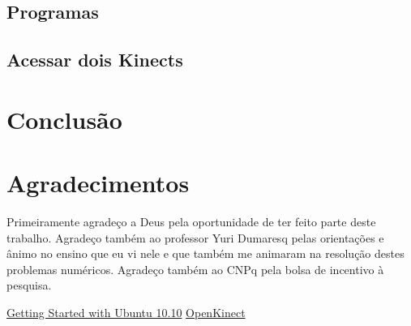 \documentclass[journal]{IEEEtran}
\begin{document}
\subsection{Programas\label{exemplos}}
\newpage

\subsection{Acessar dois Kinects}


\section{Conclusão}

\section*{Agradecimentos}

Primeiramente agradeço a Deus pela oportunidade de ter feito parte deste trabalho. Agradeço também ao professor Yuri Dumaresq pelas orientações e ânimo no ensino que eu vi nele e que também me animaram na resolução destes problemas numéricos. Agradeço também ao CNPq pela bolsa de incentivo à pesquisa.

\begin{thebibliography}{4}
  
 \href{ftp://ftp.fisio.cinvestav.mx/Manuales/linux/Getting\%20Started\%20with\%20Ubuntu\%2010.10.pdf}{Getting Started with Ubuntu 10.10}
 \href{http://openkinect.org/wiki/Main_Page}{OpenKinect}
\end{thebibliography}
\end{document}
